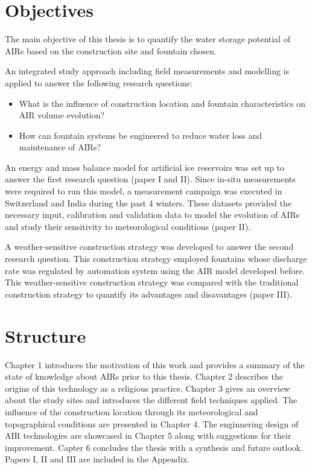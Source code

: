 \section{Objectives}

The main objective of this thesis is to quantify the water storage potential of AIRs based on the construction
site and fountain chosen. 


An integrated study approach including field measurements and modelling is applied to
answer the following research questions: 

\begin{itemize}

\item What is the influence of construction location and fountain characteristics on AIR volume evolution? 

\item How can fountain systems be engineered to reduce water loss and maintenance of AIRs?

\end{itemize}

An energy and mass balance model for artificial ice reservoirs was set up to answer the first research question
(paper I and II). Since in-situ measurements were required to run this model, a measurement campaign was
executed in Switzerland and India during the past 4 winters. These datasets provided the necessary input,
calibration and validation data to model the evolution of AIRs and study their sensitivity to meteorological
conditions (paper II). 

A weather-sensitive construction strategy was developed to answer the second research question. This
construction strategy employed fountains whose discharge rate was regulated by automation system using the AIR
model developed before. This weather-sensitive construction strategy was compared with the traditional
construction strategy to quantify its advantages and disavantages (paper III).

\section{Structure}

Chapter 1 introduces the motivation of this work and provides a summary of the state of knowledge about AIRs
prior to this thesis. Chapter 2 describes the origins of this technology as a religious practice. Chapter 3
gives an overview about the study sites and introduces the different field techniques applied. The influence of
the construction location through its meteorological and topographical conditions are presented in Chapter 4.
The enginnering design of AIR technologies are showcased in Chapter 5 along with suggestions for their
improvement. Capter 6 concludes the thesis with a synthesis and future outlook. Papers I, II and III are
included in the Appendix.


